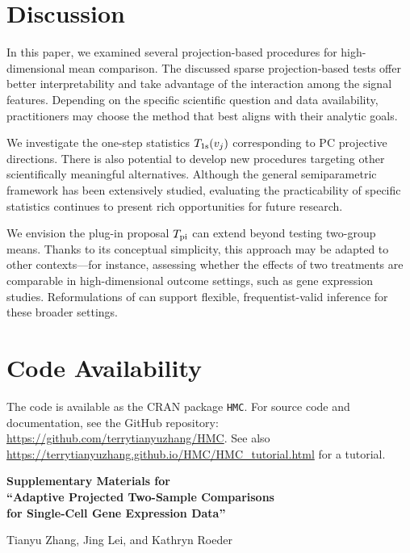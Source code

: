 \documentclass[11pt]{article}
\begin{document}
\section{Discussion}
\label{section: discussion}
In this paper, we examined several projection-based procedures for high-dimensional mean comparison. The discussed sparse projection-based tests offer better interpretability and take advantage of the interaction among the signal features. Depending on the specific scientific question and data availability, practitioners may choose the method that best aligns with their analytic goals.

We investigate the one-step statistics $T_{\rm 1s}(v_j)$ corresponding to PC projective directions. There is also potential to develop new procedures targeting other scientifically meaningful alternatives. Although the general semiparametric framework has been extensively studied, evaluating the practicability of specific statistics continues to present rich opportunities for future research.

We envision the plug-in proposal $T_{\rm pi}$ can extend beyond testing two-group means.
Thanks to its conceptual simplicity, this approach may be adapted to other contexts---for instance, assessing whether the effects of two treatments are comparable in high-dimensional outcome settings, such as gene expression studies. Reformulations of  can support flexible, frequentist-valid inference for these broader settings.

\section*{Code Availability}
The code is available as the CRAN package \texttt{HMC}. For source code and documentation, see the GitHub repository:
\url{https://github.com/terrytianyuzhang/HMC}. See also \url{https://terrytianyuzhang.github.io/HMC/HMC_tutorial.html} for a tutorial.





\newpage

\begin{center}
\LARGE\bfseries
Supplementary Materials for\\
``Adaptive Projected Two-Sample Comparisons\\ for Single-Cell Gene Expression Data''

\vspace{1em}

\normalsize
Tianyu Zhang, Jing Lei, and Kathryn Roeder

\end{center}
\end{document}
